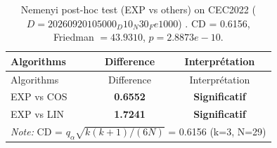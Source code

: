 \begin{center}
\small
\renewcommand{\arraystretch}{1.25}
\begin{longtable}{lcc}
\caption{Nemenyi post-hoc test (EXP vs others) on CEC2022 ($D=20260920105000_D10_N30_Fe1000$) . CD = 0.6156, Friedman $=43.9310$, $p=2.8873e-10$.}
\label{tab:nemenyi_CEC2022_20260920105000_D10_N30_Fe1000} \\
\toprule
Algorithms & Difference & Interprétation \\
\midrule
\endfirsthead
\toprule
Algorithms & Difference & Interprétation \\
\midrule
\endhead
EXP vs COS & \textbf{0.6552} & \textbf{Significatif} \\
EXP vs LIN & \textbf{1.7241} & \textbf{Significatif} \\
\midrule
\multicolumn{3}{l}{\textit*{Note:} CD = $q_\alpha \sqrt{k(k+1)/(6N)}$ = 0.6156 (k=3, N=29)} \\
\bottomrule
\end{longtable}
\end{center}